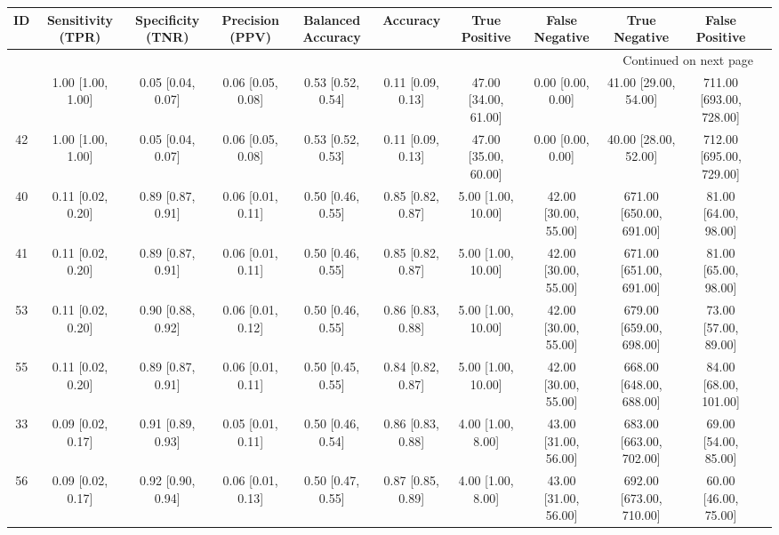 \documentclass[8pt]{article}
\begin{document}
\begin{center}
\begin{footnotesize}
\begin{longtable}{|ccccccccccc|}
\toprule
 ID &  Sensitivity (TPR) &  Specificity (TNR) &    Precision (PPV) &  Balanced Accuracy &           Accuracy &         True Positive &        False Negative &            True Negative &           False Positive \\
\midrule
\endhead
\midrule
\multicolumn{10}{r}{{Continued on next page}} \\
\midrule
\endfoot

\bottomrule
\endlastfoot
 38 &  1.00 [1.00, 1.00] &  0.05 [0.04, 0.07] &  0.06 [0.05, 0.08] &  0.53 [0.52, 0.54] &  0.11 [0.09, 0.13] &  47.00 [34.00, 61.00] &     0.00 [0.00, 0.00] &     41.00 [29.00, 54.00] &  711.00 [693.00, 728.00] \\
 42 &  1.00 [1.00, 1.00] &  0.05 [0.04, 0.07] &  0.06 [0.05, 0.08] &  0.53 [0.52, 0.53] &  0.11 [0.09, 0.13] &  47.00 [35.00, 60.00] &     0.00 [0.00, 0.00] &     40.00 [28.00, 52.00] &  712.00 [695.00, 729.00] \\
 40 &  0.11 [0.02, 0.20] &  0.89 [0.87, 0.91] &  0.06 [0.01, 0.11] &  0.50 [0.46, 0.55] &  0.85 [0.82, 0.87] &    5.00 [1.00, 10.00] &  42.00 [30.00, 55.00] &  671.00 [650.00, 691.00] &     81.00 [64.00, 98.00] \\
 41 &  0.11 [0.02, 0.20] &  0.89 [0.87, 0.91] &  0.06 [0.01, 0.11] &  0.50 [0.46, 0.55] &  0.85 [0.82, 0.87] &    5.00 [1.00, 10.00] &  42.00 [30.00, 55.00] &  671.00 [651.00, 691.00] &     81.00 [65.00, 98.00] \\
 53 &  0.11 [0.02, 0.20] &  0.90 [0.88, 0.92] &  0.06 [0.01, 0.12] &  0.50 [0.46, 0.55] &  0.86 [0.83, 0.88] &    5.00 [1.00, 10.00] &  42.00 [30.00, 55.00] &  679.00 [659.00, 698.00] &     73.00 [57.00, 89.00] \\
 55 &  0.11 [0.02, 0.20] &  0.89 [0.87, 0.91] &  0.06 [0.01, 0.11] &  0.50 [0.45, 0.55] &  0.84 [0.82, 0.87] &    5.00 [1.00, 10.00] &  42.00 [30.00, 55.00] &  668.00 [648.00, 688.00] &    84.00 [68.00, 101.00] \\
 33 &  0.09 [0.02, 0.17] &  0.91 [0.89, 0.93] &  0.05 [0.01, 0.11] &  0.50 [0.46, 0.54] &  0.86 [0.83, 0.88] &     4.00 [1.00, 8.00] &  43.00 [31.00, 56.00] &  683.00 [663.00, 702.00] &     69.00 [54.00, 85.00] \\
 56 &  0.09 [0.02, 0.17] &  0.92 [0.90, 0.94] &  0.06 [0.01, 0.13] &  0.50 [0.47, 0.55] &  0.87 [0.85, 0.89] &     4.00 [1.00, 8.00] &  43.00 [31.00, 56.00] &  692.00 [673.00, 710.00] &     60.00 [46.00, 75.00] \\

\end{longtable}
\end{footnotesize}
\end{center}
\end{document}
